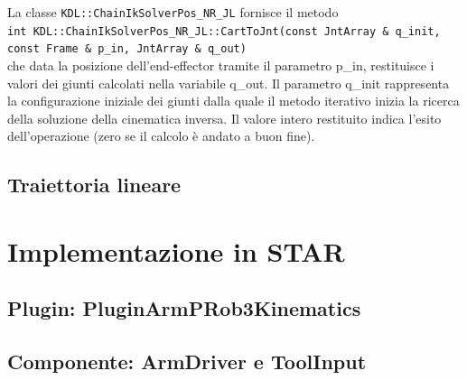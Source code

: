 La classe \texttt{KDL::ChainIkSolverPos\_NR\_JL} fornisce il metodo \\
\texttt{int KDL::ChainIkSolverPos\_NR\_JL::CartToJnt(const JntArray \&\ q\_init, const Frame \&\ p\_in, JntArray \&\	q\_out)} \\ che data la posizione dell'end-effector tramite il parametro p\_in, restituisce i valori dei giunti calcolati nella variabile q\_out. Il parametro q\_init rappresenta la configurazione iniziale dei giunti dalla quale il metodo iterativo inizia la ricerca della soluzione della cinematica inversa. Il valore intero restituito indica l'esito dell'operazione (zero se il calcolo è andato a buon fine).

\section{Traiettoria lineare}

\chapter{Implementazione in STAR} 
\section{Plugin: PluginArmPRob3Kinematics}
\section{Componente: ArmDriver e ToolInput}
